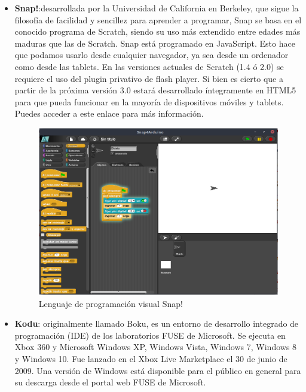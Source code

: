 \begin{itemize}
\item \textbf{Snap!}:desarrollada por la Universidad de California en Berkeley, que sigue la filosofía de facilidad y sencillez para aprender a programar,  Snap se basa en el conocido programa de Scratch, siendo su uso más extendido entre edades más maduras que las de Scratch.
Snap está programado en JavaScript. Esto hace que podamos usarlo desde cualquier navegador, ya sea desde un ordenador como desde las tablets.
En las versiones actuales de Scratch (1.4 ó 2.0) se requiere el uso del plugin privativo de flash player. Si bien es cierto que a partir de la próxima versión 3.0 estará desarrollado íntegramente en HTML5 para que pueda funcionar en la mayoría de dispositivos móviles y tablets. Puedes acceder a este enlace para más información.

\begin{figure}[H]
    \centering
    \includegraphics[scale=0.40]{img/snap.png}
  	\caption{Lenguaje de programación visual Snap!}
  	\label{fig:snap}
\end{figure}


\item \textbf{Kodu}: originalmente llamado Boku, es un entorno de desarrollo integrado de programación (IDE) de los laboratorios FUSE de Microsoft. Se ejecuta en Xbox 360 y Microsoft Windows XP, Windows Vista, Windows 7, Windows 8 y Windows 10. Fue lanzado en el Xbox Live Marketplace el 30 de junio de 2009. Una versión de Windows está disponible para el público en general para su descarga desde el portal web FUSE de Microsoft. 

\end{itemize}